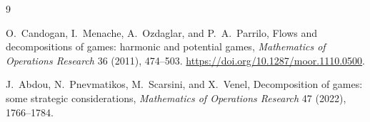 \documentclass[11pt]{article}
\begin{document}
\begin{thebibliography}{9}

O.~Candogan, I.~Menache, A.~Ozdaglar, and P.~A.~Parrilo,
\newblock Flows and decompositions of games: harmonic and potential games,
\newblock \emph{Mathematics of Operations Research} 36 (2011), 474--503.
\newblock \url{https://doi.org/10.1287/moor.1110.0500}.

J.~Abdou, N.~Pnevmatikos, M.~Scarsini, and X.~Venel,
\newblock Decomposition of games: some strategic considerations,
\newblock \emph{Mathematics of Operations Research} 47 (2022), 1766--1784.

\end{thebibliography}
\end{document}
